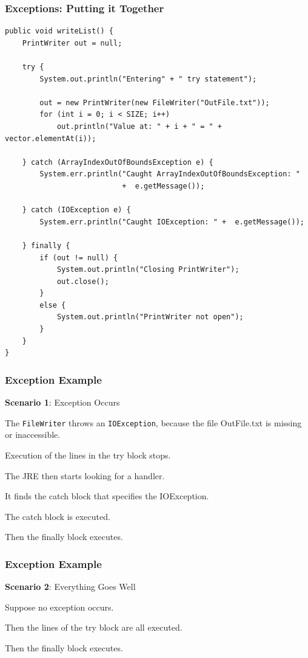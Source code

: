 \begin{frame}[fragile]
\frametitle{Exceptions: Putting it Together}
\begin{changemargin}{1cm}
{\tiny
\begin{verbatim}
public void writeList() {
    PrintWriter out = null;

    try {
        System.out.println("Entering" + " try statement");

        out = new PrintWriter(new FileWriter("OutFile.txt"));
        for (int i = 0; i < SIZE; i++)
            out.println("Value at: " + i + " = " + vector.elementAt(i));
                  
    } catch (ArrayIndexOutOfBoundsException e) {
        System.err.println("Caught ArrayIndexOutOfBoundsException: "
                           +  e.getMessage());
                                 
    } catch (IOException e) {
        System.err.println("Caught IOException: " +  e.getMessage());
                                 
    } finally {
        if (out != null) {
            System.out.println("Closing PrintWriter");
            out.close();
        } 
        else {
            System.out.println("PrintWriter not open");
        }
    }
}
\end{verbatim}
}

\end{changemargin}
\end{frame}

\begin{frame}
\frametitle{Exception Example}
\begin{changemargin}{1cm}

\textbf{Scenario 1}: Exception Occurs

The \texttt{FileWriter} throws an \texttt{IOException}, because the file OutFile.txt is missing or inaccessible. 

Execution of the lines in the try block stops. 

The JRE then starts looking for a handler. 

It finds the catch block that specifies the IOException. 

The catch block is executed. 

Then the finally block executes.

\end{changemargin}
\end{frame}


\begin{frame}
\frametitle{Exception Example}
\begin{changemargin}{1cm}

\textbf{Scenario 2}: Everything Goes Well 

Suppose no exception occurs. 

Then the lines of the try block are all executed.

Then the finally block executes.

\end{changemargin}
\end{frame}

